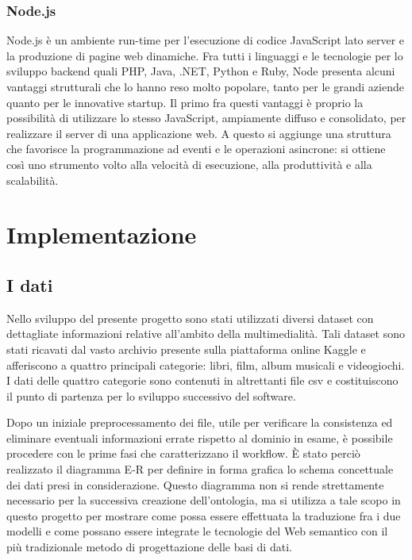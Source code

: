 \documentclass[Lau,binding=0.6cm,noexaminfo,oneside]{sapthesis}
\begin{document}
\subsection{Node.js}

Node.js è un ambiente run-time per l'esecuzione di codice JavaScript lato server e la produzione di pagine web dinamiche. Fra tutti i linguaggi e le tecnologie per lo sviluppo backend quali PHP, Java, .NET, Python e Ruby, Node presenta alcuni vantaggi strutturali che lo hanno reso molto popolare, tanto per le grandi aziende quanto per le innovative startup. Il primo fra questi vantaggi è proprio la possibilità di utilizzare lo stesso JavaScript, ampiamente diffuso e consolidato, per realizzare il server di una applicazione web. A questo si aggiunge una struttura che favorisce la programmazione ad eventi e le operazioni asincrone: si ottiene così uno strumento volto alla velocità di esecuzione, alla produttività e alla scalabilità.\medskip



\chapter{Implementazione}
\section{I dati}

Nello sviluppo del presente progetto sono stati utilizzati diversi dataset con dettagliate informazioni relative all'ambito della multimedialità. Tali dataset sono stati ricavati dal vasto archivio presente sulla piattaforma online Kaggle e afferiscono a quattro principali categorie: libri, film, album musicali e videogiochi. I dati delle quattro categorie sono contenuti in altrettanti file csv e costituiscono il punto di partenza per lo sviluppo successivo del software.\medskip

Dopo un iniziale preprocessamento dei file, utile per verificare la consistenza ed eliminare eventuali informazioni errate rispetto al dominio in esame, è possibile procedere con le prime fasi che caratterizzano il workflow. \MakeUppercase{è} stato perciò realizzato il diagramma E-R per definire in forma grafica lo schema concettuale dei dati presi in considerazione. Questo diagramma non si rende strettamente necessario per la successiva creazione dell'ontologia, ma si utilizza a tale scopo in questo progetto per mostrare come possa essere effettuata la traduzione fra i due modelli e come possano essere integrate le tecnologie del Web semantico con il più tradizionale metodo di progettazione delle basi di dati.\medskip
\end{document}
